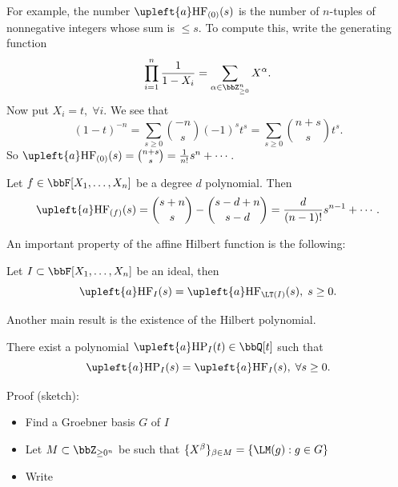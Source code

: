 \begin{itemize}
    \begin{example}
        For example, the number $\upleft{a}\text{HF}_{(0)}(s)$ is the number of $n$-tuples of 
        nonnegative integers whose sum is $\leq s$. To compute this, write the generating function
        \begin{equation}
            \prod_{i=1}^n\frac{1}{1-X_i} = \sum_{\alpha\in\bbZ_{\geq0}^n}X^\alpha.
        \end{equation}
        Now put $X_i = t,\;\forall i$. We see that 
        \begin{equation}
            (1-t)^{-n} = \sum_{s\geq0}\binom{-n}{s}(-1)^st^s = \sum_{s\geq0}\binom{n+s}{s}t^s.
        \end{equation}
        So $\upleft{a}\text{HF}_{(0)}(s)=\binom{n+s}{s}=\frac{1}{n!}s^n + \cdots$.
    \end{example}
    \begin{example}
        Let $f\in\bbF[X_1,\dots, X_n]$ be a degree $d$ polynomial. Then 
        \begin{equation}
            \upleft{a}\text{HF}_{(f)}(s) = \binom{s+n}{s} - \binom{s-d+n}{s-d} = \frac{d}{(n-1)!}s^{n-1}+\cdots.
        \end{equation} 
    \end{example}
    An important property of the affine Hilbert function is the following:
\begin{theorem}
    Let $I\subset \bbF[X_1,\dots, X_n]$ be an ideal, then 
    \begin{equation}
        \upleft{a}\text{HF}_I(s)  = \upleft{a}\text{HF}_{\LT(I)}(s),\;s\geq0.
    \end{equation}
\end{theorem}
Another main result is the existence of the Hilbert polynomial.
\begin{theorem}
    There exist a polynomial $\upleft{a}\text{HP}_I(t)\in\bbQ[t]$ such that 
    \begin{equation}
        \upleft{a}\text{HP}_I(s) =   \upleft{a}\text{HF}_I(s),\;\forall s\geq0.
    \end{equation}
\end{theorem}
Proof (sketch):
\begin{itemize}
    \item Find a Groebner basis $G$ of $I$
    \item Let $M\subset \bbZ_{\geq0^n}$ be such that $\{X^\beta\}_{\beta\in M} = \{\LM(g):g\in G\}$
    \item Write 
    \begin{equation}

\end{equation}
\end{itemize}
\end{itemize}
